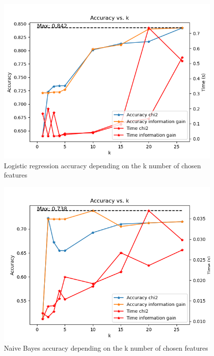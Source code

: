 \documentclass{article}
\begin{document}
\begin{figure}
    \centering
    \includegraphics{report_img/k_search/logistic_regression}
    \caption{Logistic regression accuracy depending on the k number of chosen features}
    \label{fig:}
\end{figure}

\begin{figure}
    \centering
    \includegraphics{report_img/k_search/naive_bayes}
    \caption{Naive Bayes accuracy depending on the k number of chosen features}
    \label{fig:}
\end{figure}
\end{document}
